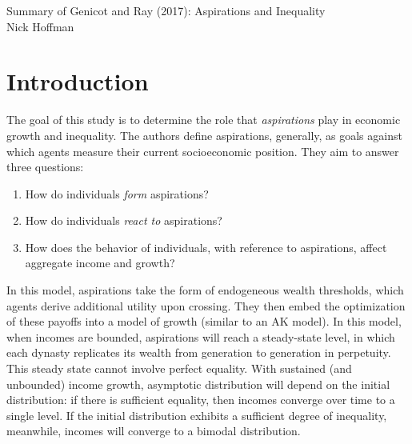 \documentclass[11pt]{article}
\begin{document}
\begin{flushleft}
    Summary of Genicot and Ray (2017): Aspirations and Inequality \\
    Nick Hoffman \\
\end{flushleft}
    \section{Introduction}
    The goal of this study is to determine the role that \textit{aspirations} play in economic growth and inequality. The authors define aspirations, generally, as goals against which agents measure their current socioeconomic position. They aim to answer three questions:
    \begin{enumerate}
        \item How do individuals \textit{form} aspirations?
        \item How do individuals \textit{react to} aspirations?
        \item How does the behavior of individuals, with reference to aspirations, affect aggregate income and growth?
    \end{enumerate}
    In this model, aspirations take the form of endogeneous wealth thresholds, which agents derive additional utility upon crossing. They then embed the optimization of these payoffs into a model of growth (similar to an AK model). In this model, when incomes are bounded, aspirations will reach a steady-state level, in which each dynasty replicates its wealth from generation to generation in perpetuity. This steady state cannot involve perfect equality. With sustained (and unbounded) income growth, asymptotic distribution will depend on the initial distribution: if there is sufficient equality, then incomes converge over time to a single level. If the initial distribution exhibits a sufficient degree of inequality, meanwhile, incomes will converge to a bimodal distribution. 
\end{document}

